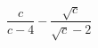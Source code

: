 \begin{ex}[type=expression]
	\begin{condition}
		\( \dfrac{c}{c-4}-\dfrac{\sqrt{c}}{\sqrt{c}-2} \)
	\end{condition}
\end{ex}